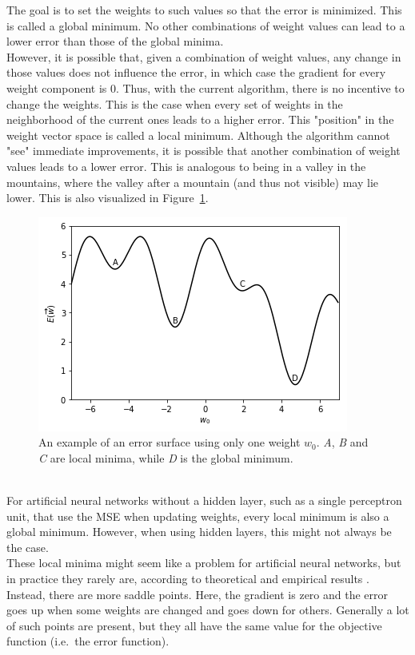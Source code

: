 The goal is to set the weights to such values so that the error is minimized.
This is called a global minimum.
No other combinations of weight values can lead to a lower error than those of the global minima.\\
However, it is possible that, given a combination of weight values, any change in those values does not influence the error, in which case the gradient for every weight component is $0$.
Thus, with the current algorithm, there is no incentive to change the weights.
This is the case when every set of weights in the neighborhood of the current ones leads to a higher error. This "position" in the weight vector space is called a local minimum.
Although the algorithm cannot "see" immediate improvements, it is possible that another combination of weight values leads to a lower error.
This is analogous to being in a valley in the mountains, where the valley after a mountain (and thus not visible) may lie lower.
This is also visualized in Figure~\ref{fig:error_surface}.
\begin{figure}[htb]
    \centering
    \includegraphics[width=.8\linewidth]{images/error_surface.png}
    \caption[An example of an error surface]{An example of an error surface using only one weight $w_0$. \textit{A}, \textit{B} and \textit{C} are local minima, while \textit{D} is the global minimum.}
    \label{fig:error_surface}
\end{figure}\\

For artificial neural networks without a hidden layer, such as a single perceptron unit, that use the MSE when updating weights, every local minimum is also a global minimum.
However, when using hidden layers, this might not always be the case.\\
These local minima might seem like a problem for artificial neural networks, but in practice they rarely are, according to theoretical and empirical results \parencite{choromanska2015loss}.
Instead, there are more saddle points.
Here, the gradient is zero and the error goes up when some weights are changed and goes down for others.
Generally a lot of such points are present, but they all have the same value for the objective function (i.e.\ the error function).\\

